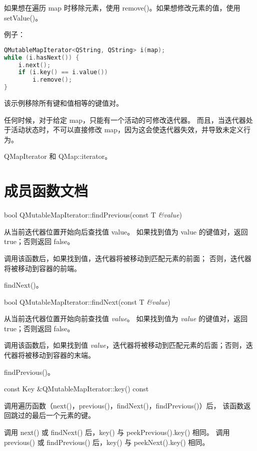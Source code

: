 如果想在遍历 map 时移除元素，使用 remove()。如果想修改元素的值，使用 setValue()。

例子：

\begin{lstlisting}[language=C++]
QMutableMapIterator<QString, QString> i(map);
while (i.hasNext()) {
    i.next();
    if (i.key() == i.value())
        i.remove();
}
\end{lstlisting}


该示例移除所有键和值相等的键值对。

任何时候，对于给定 map，只能有一个活动的可修改迭代器。
而且，当迭代器处于活动状态时，不可以直接修改 map，因为这会使迭代器失效，并导致未定义行为。

\begin{seeAlso}
QMapIterator 和 QMap::iterator。
\end{seeAlso}

\section{成员函数文档}

bool QMutableMapIterator::findPrevious(const T \emph{\&value})

从当前迭代器位置开始向后查找值 value。
如果找到值为 value 的键值对，返回 true；否则返回 false。

调用该函数后，如果找到值，迭代器将被移动到匹配元素的前面；
否则，迭代器将被移动到容器的前端。

\begin{seeAlso}
findNext()。
\end{seeAlso}

bool QMutableMapIterator::findNext(const T \emph{\&value})

从当前迭代器位置开始向前查找值 \emph{value}。
如果找到值为 \emph{value} 的键值对，返回 true；否则返回 false。

调用该函数后，如果找到值 \emph{value}，迭代器将被移动到匹配元素的后面；否则，迭代器将被移动到容器的末端。

\begin{seeAlso}
findPrevious()。
\end{seeAlso}

const Key \&QMutableMapIterator::key() const

调用遍历函数（next()，previous()，findNext()，findPrevious()）后，
该函数返回跳过的最后一个元素的键。

调用 next() 或 findNext() 后，key() 与 peekPrevious().key() 相同。
调用 previous() 或 findPrevious() 后，key() 与 peekNext().key() 相同。

